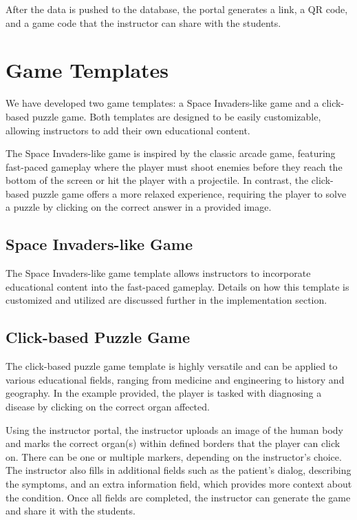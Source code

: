 After the data is pushed to the database, the portal generates a link, a QR code, and a game code that the instructor can share with the students.

\section{Game Templates}

We have developed two game templates: a Space Invaders-like game and a click-based puzzle game. Both templates are designed to be easily customizable, allowing instructors to add their own educational content.

The Space Invaders-like game is inspired by the classic arcade game, featuring fast-paced gameplay where the player must shoot enemies before they reach the bottom of the screen or hit the player with a projectile. In contrast, the click-based puzzle game offers a more relaxed experience, requiring the player to solve a puzzle by clicking on the correct answer in a provided image.

\subsection{Space Invaders-like Game}

The Space Invaders-like game template allows instructors to incorporate educational content into the fast-paced gameplay. Details on how this template is customized and utilized are discussed further in the implementation section.

\subsection{Click-based Puzzle Game}

The click-based puzzle game template is highly versatile and can be applied to various educational fields, ranging from medicine and engineering to history and geography. In the example provided, the player is tasked with diagnosing a disease by clicking on the correct organ affected.

Using the instructor portal, the instructor uploads an image of the human body and marks the correct organ(s) within defined borders that the player can click on. There can be one or multiple markers, depending on the instructor's choice. The instructor also fills in additional fields such as the patient’s dialog, describing the symptoms, and an extra information field, which provides more context about the condition. Once all fields are completed, the instructor can generate the game and share it with the students.

